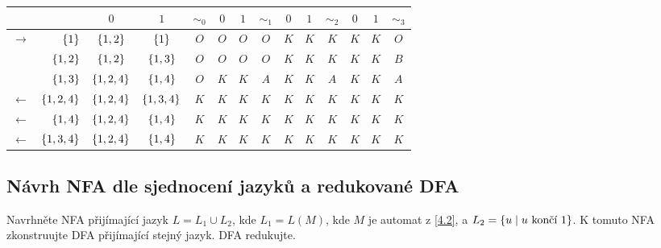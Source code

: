 \begin{center}
    \begin{tabular}{|r r|c c||c|c c||c|c c||c|c c|| c |}
        \hline
        & & $ 0 $ & $ 1 $ & $ \sim_0 $ & $ 0 $ & $ 1 $ & $ \sim_1 $ & $ 0 $ & $ 1 $ & $ \sim_2 $ & $ 0 $ & $ 1 $ & $\sim_3$ \\ \hline \hline
        $\to$   & $\left\lbrace 1 \right\rbrace$      & $\left\lbrace 1,2 \right\rbrace$    & $\left\lbrace 1 \right\rbrace$      & $O$ & $O$ & $O$ & $O$ & $K$ & $K$ & $K$ & $K$ & $K$ & $O$ \\
                & $\left\lbrace 1,2 \right\rbrace$    & $\left\lbrace 1, 2 \right\rbrace$   & $\left\lbrace 1, 3 \right\rbrace$   & $O$ & $O$ & $O$ & $O$ & $K$ & $K$ & $K$ & $K$ & $K$ & $B$ \\
                & $\left\lbrace 1,3 \right\rbrace$    & $\left\lbrace 1, 2, 4 \right\rbrace$& $\left\lbrace 1,4 \right\rbrace$    & $O$ & $K$ & $K$ & $A$ & $K$ & $K$ & $A$ & $K$ & $K$ & $A$ \\
        $\gets$ & $\left\lbrace 1,2,4 \right\rbrace$  & $\left\lbrace 1, 2, 4 \right\rbrace$& $\left\lbrace 1, 3, 4 \right\rbrace$& $K$ & $K$ & $K$ & $K$ & $K$ & $K$ & $K$ & $K$ & $K$ & $K$ \\
        $\gets$ & $\left\lbrace 1,4 \right\rbrace$    & $\left\lbrace 1,2, 4 \right\rbrace$ & $\left\lbrace 1, 4 \right\rbrace$   & $K$ & $K$ & $K$ & $K$ & $K$ & $K$ & $K$ & $K$ & $K$ & $K$ \\
        $\gets$ & $\left\lbrace 1, 3, 4 \right\rbrace$& $\left\lbrace 1, 2, 4 \right\rbrace$& $\left\lbrace 1, 4 \right\rbrace$   & $K$ & $K$ & $K$ & $K$ & $K$ & $K$ & $K$ & $K$ & $K$ & $K$ \\
        \hline
    \end{tabular}

\medskip


\end{center}

\subsection{Návrh NFA dle sjednocení jazyků a redukované DFA}
Navrhněte NFA přijímající jazyk $L= L_1 \cup L_2$, kde $L_1 = L(M)$, kde $M$ je automat z \ref{4.2}, a
${L_2 = \left\lbrace u \mid u \text{ končí } 1 \right\rbrace}$. K tomuto NFA zkonstruujte DFA přijímající stejný jazyk. DFA redukujte.


